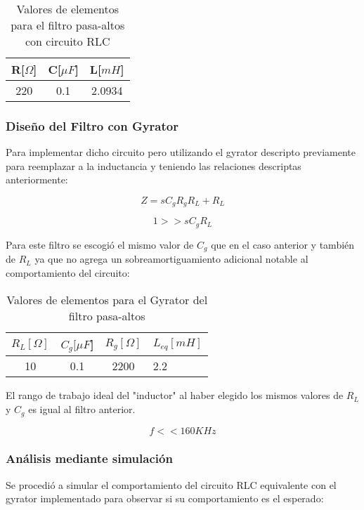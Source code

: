 \begin{table}[H]
    \centering
    \begin{tabular}{|c|c|c|}
    \hline
    \rowcolor[HTML]{C0C0C0} 
    R[$\Omega$] & C[$\mu F$] & L[$mH$]  \\ \hline
    220     & 0.1  & 2.0934 \\ \hline
    \end{tabular}
    \caption{Valores de elementos para el filtro pasa-altos con circuito RLC}
    \end{table}

\subsubsection{Diseño del Filtro con Gyrator}

Para implementar dicho circuito pero utilizando el gyrator descripto previamente
para reemplazar a la inductancia y teniendo las relaciones descriptas anteriormente:

$$Z=sC_gR_gR_L+R_L$$

$$1 >> sC_gR_L$$

Para este filtro se escogió el mismo valor de $C_g$ que en el caso anterior y también de $R_L$ ya que no agrega un sobreamortiguamiento
adicional notable al comportamiento del circuito:

\begin{table}[H]
    \centering
    \begin{tabular}{|c|c|c|l|}
    \hline
    \rowcolor[HTML]{C0C0C0} 
    $R_L[\Omega]$ & $C_g[\mu F$] & $R_g[\Omega]$  & $L_{eq}[mH]$ \\ \hline
    10      & 0.1  & 2200 & 2.2        \\ \hline
    \end{tabular}
    \caption{Valores de elementos para el Gyrator del filtro pasa-altos}
    \end{table}


El rango de trabajo ideal del "inductor" al haber elegido los mismos valores de $R_L$ y $C_g$ es igual al filtro anterior.

$$f << 160 KHz$$

\subsubsection{Análisis mediante simulación}

Se procedió a simular el comportamiento del circuito RLC equivalente con el gyrator implementado para observar si su comportamiento es el esperado:


